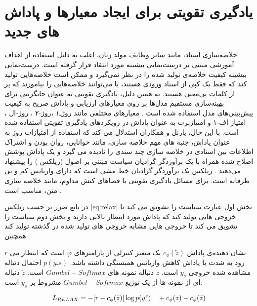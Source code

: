 \section{یادگیری تقویتی  برای ایجاد معیارها و پاداش های جدید}
	
	خلاصه‌سازی اسناد، مانند سایر وظایف مولد زبان،  اغلب به دلیل استفاده از اهداف آموزشی مبتنی بر  درست‌نمایی بیشینه
	 مورد انتقاد قرار گرفته است.
	درست‌نمایی بیشینه کیفیت خلاصه‌ی تولید شده را در نظر نمی‌گیرد و ممکن است خلاصه‌هایی تولید کند که فقط یک کپی از اسناد ورودی هستند، یا می‌توانند خلاصه‌هایی را بیاموزند که پر از کلمات بی‌معنی هستند. به همین دلیل، یادگیری تقویتی به عنوان جایگزینی برای بهینه‌سازی مستقیم مدل‌ها بر روی معیارهای ارزیابی و پاداش صریح به کیفیت پیش‌بینی‌های مدل استفاده شده است
	\cite{Parnell2022AMC }. 
	معیارهای مختلفی مانند روژـ۱
،روژ-۲
،
روژ-‌ال
،
امتیاز اف-۱
	و امتیازبرت
	 به عنوان پاداش در رویکردهای یادگیری تقویتی استفاده شده است. با این حال، پارنل و همکاران  استدلال می کند که استفاده از امتیازات روژ به عنوان پاداش، جنبه های مهم خلاصه سازی، مانند خوانایی، روان بودن و اشتراک اطلاعات بین اسنادی در خلاصه سازی چند سندی را نادیده می گیرد و یک پاداش پوشش اصلاح شده همراه با یک برآوردگر گرادیان سیاست مبتنی بر اصول (ریلکس )
	  را پیشنهاد می‌دهند
	  \cite{Parnell2022AMC,Alomari2022DeepRA}.
	   ریلکس یک برآوردگر گرادیان خط مشی است که دارای واریانس کم و بی طرفانه است. برای مسائل یادگیری تقویتی با فضاهای کنش مداوم، مانند خلاصه سازی متن، مناسب است
	   \cite{Grathwohl2017BackpropagationTT}.

	  در تابع ضرر بر حسب ریلکس \ref{eq:relax}
	  بخش اول عبارت سیاست را تشویق می کند تا خروجی هایی تولید کند که پاداش مورد انتظار بالایی دارند و بخش دوم سیاست را تشویق می کند تا خروجی هایی مشابه خروجی های تولید شده در گذشته تولید کند همچنین
	  
	  $ r $
	  نشان دهنده‌ی پاداش 
	 $  c_\phi(\tilde{z}) $
	 یک متغیر کنترلی از پارامترهای $ φ $ است که انتظار می رود به شدت با پاداش کاهش واریانس همبستگی داشته باشد.
	$  p(yـs) $ 
	احتمال دنباله مشاهده شده خروجی $ y_s $ است.
	 $ z $
	  دنباله نمونه های $Gumbel-Softmax  $ است.
	 $ \tilde{z} $
	  دنباله ای از نمونه ها از یک توزیع $ Gumbel-Softmax $ مشروط بر $ y_s $ است.
	
	  
	  \begin{equation}
	  \label{eq:relax}
	  L_\text{$ RELAX $} = -[r - c_\phi(\tilde{z})]   \log p(y^{s}) \quad + c_\phi(z) - c_\phi(\tilde{z})
	  \end{equation}
	
